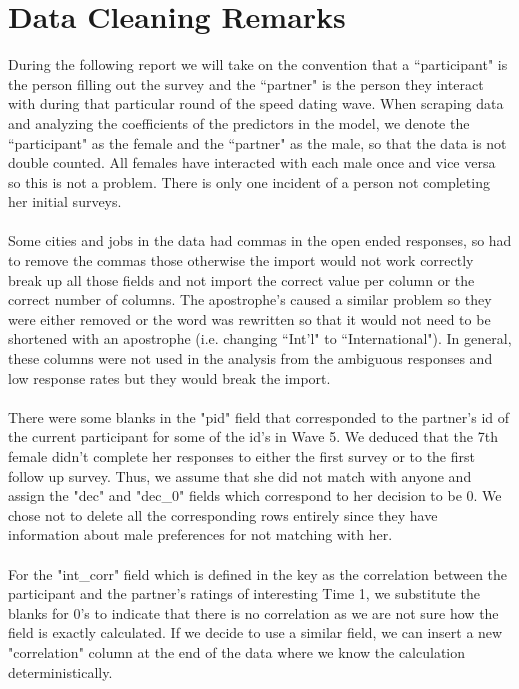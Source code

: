 \documentclass{article}
\begin{document}
\section{Data Cleaning Remarks}
During the following report we will take on the convention that a ``participant" is the person filling out the survey and the ``partner" is the person they interact with during that particular round of the speed dating wave.  When scraping data and analyzing the coefficients of the predictors in the model, we denote the ``participant" as the female and the ``partner" as the male, so that the data is not double counted.  All females have interacted with each male once and vice versa so this is not a problem.  There is only one incident of a person not completing her initial surveys.\\
\null\\
Some cities and jobs in the data had commas in the open ended responses, so had to remove the commas those otherwise the import would not work correctly break up all those fields and not import the correct value per column or the correct number of columns.  The apostrophe's caused a similar problem so they were either removed or the word was rewritten so that it would not need to be shortened with an apostrophe (i.e. changing ``Int'l" to ``International").  In general, these columns were not used in the analysis from the ambiguous responses and low response rates but they would break the import.\\
\null\\
There were some blanks in the "pid" field that corresponded to the partner's id of the current participant for some of the id's in Wave 5. We deduced that the 7th female  didn't complete her responses to either the first survey or to the first follow up survey. Thus, we assume that she did not match with anyone and assign the "dec" and "dec\_0" fields which correspond to her decision to be 0. We chose not to delete all the corresponding rows entirely since they have information about male preferences for not matching with her.\\
\null\\
For the "int\_corr" field which is defined in the key as the correlation between the participant and the partner's ratings of interesting Time 1, we substitute the blanks for 0's to indicate that there is no correlation as we are not sure how the field is exactly calculated. If we decide to use a similar field, we can insert a new "correlation" column at the end of the data where we know the calculation deterministically.\\
\end{document}
